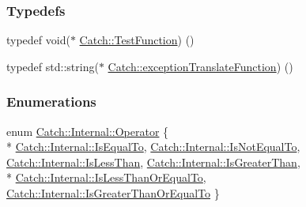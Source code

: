 \subsubsection*{Typedefs}
\begin{DoxyCompactItemize}
\item 
typedef void($\ast$ \hyperlink{a00117_a26414f52d0835939fae52aadd27e6257}{Catch\+::\+Test\+Function}) ()
\item 
typedef std\+::string($\ast$ \hyperlink{a00117_a14edb319150d3e108bbdef994f9eec2a}{Catch\+::exception\+Translate\+Function}) ()
\end{DoxyCompactItemize}
\subsubsection*{Enumerations}
\begin{DoxyCompactItemize}
\item 
enum \hyperlink{a00120_ae3f96598a7858155750bf38e7295d83e}{Catch\+::\+Internal\+::\+Operator} \{ \\*
\hyperlink{a00120_ae3f96598a7858155750bf38e7295d83ea30e0accba6ec8384f4383b04dd2a6a9e}{Catch\+::\+Internal\+::\+Is\+Equal\+To}, 
\hyperlink{a00120_ae3f96598a7858155750bf38e7295d83ea1e1699cf7d3dbee0908f1a123da2456d}{Catch\+::\+Internal\+::\+Is\+Not\+Equal\+To}, 
\hyperlink{a00120_ae3f96598a7858155750bf38e7295d83eabbbfc41706595e50acbefa8408004b93}{Catch\+::\+Internal\+::\+Is\+Less\+Than}, 
\hyperlink{a00120_ae3f96598a7858155750bf38e7295d83eac0e8866139e99803d169595af70f6c22}{Catch\+::\+Internal\+::\+Is\+Greater\+Than}, 
\\*
\hyperlink{a00120_ae3f96598a7858155750bf38e7295d83ea0db29a4c3f1e81260036c5e27a8407fd}{Catch\+::\+Internal\+::\+Is\+Less\+Than\+Or\+Equal\+To}, 
\hyperlink{a00120_ae3f96598a7858155750bf38e7295d83ead2de7e9565e59e36c0987e402203ce1c}{Catch\+::\+Internal\+::\+Is\+Greater\+Than\+Or\+Equal\+To}
 \}
\end{DoxyCompactItemize}
